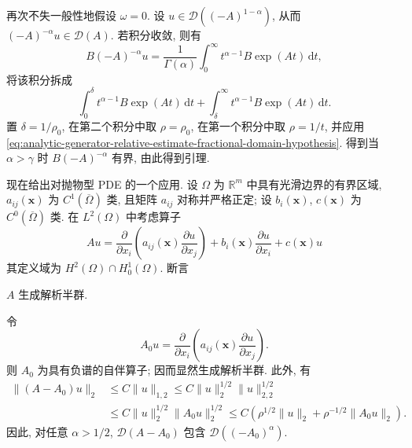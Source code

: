 \begin{Proof}
再次不失一般性地假设 $\omega=0$. 设 $u\in\mathcal{D}((-A)^{1-\alpha})$, 从而 $(-A)^{-\alpha}u\in\mathcal{D}(A)$. 若积分收敛, 则有
\begin{equation}\label{eq:analytic-generator-fractional-domain-converse-integral}
B(-A)^{-\alpha}u=\dfrac{1}{\Gamma(\alpha)}\int_0^\infty t^{\alpha-1}B\exp(At)\,\mathrm{d}t,
\end{equation}
将该积分拆成
\begin{equation}\label{eq:analytic-generator-fractional-domain-converse-integral-split}
\int_0^\delta t^{\alpha-1}B\exp(At)\,\mathrm{d}t+\int_\delta^\infty t^{\alpha-1}B\exp(At)\,\mathrm{d}t.
\end{equation}
置 $\delta=1/\rho_0$, 在第二个积分中取 $\rho=\rho_0$, 在第一个积分中取 $\rho=1/t$, 并应用 \eqref{eq:analytic-generator-relative-estimate-fractional-domain-hypothesis}. 得到当 $\alpha>\gamma$ 时 $B(-A)^{-\alpha}$ 有界, 由此得到引理.
\end{Proof}

现在给出对抛物型 PDE 的一个应用. 设 $\Omega$ 为 $\mathbb{R}^m$ 中具有光滑边界的有界区域, $a_{ij}(\bm{x})$ 为 $C^1(\overline\Omega)$ 类, 且矩阵 $a_{ij}$ 对称并严格正定; 设 $b_i(\bm{x})$, $c(\bm{x})$ 为 $C^0(\overline\Omega)$ 类. 在 $L^2(\Omega)$ 中考虑算子
\begin{equation}\label{eq:analytic-semigroup-elliptic-dirichlet-generator}
Au=\dfrac{\partial}{\partial x_i}\left(a_{ij}(\bm{x})\dfrac{\partial u}{\partial x_j}\right)+b_i(\bm{x})\dfrac{\partial u}{\partial x_i}+c(\bm{x})u
\end{equation}
其定义域为 $H^2(\Omega)\cap H_0^1(\Omega)$. 断言

\begin{Theorem}
\label{thm:elliptic-dirichlet-analytic-generation}
$A$ 生成解析半群.
\end{Theorem}

\begin{Proof}
令
\begin{equation}\label{eq:analytic-semigroup-elliptic-principal-self-adjoint-part}
A_0u=\dfrac{\partial}{\partial x_i}\left(a_{ij}(\bm{x})\dfrac{\partial u}{\partial x_j}\right).
\end{equation}
则 $A_0$ 为具有负谱的自伴算子; 因而显然生成解析半群. 此外, 有\[\begin{aligned}
\|(A-A_0)u\|_2&\leq C\|u\|_{1,2}\leq C\|u\|_2^{1/2}\|u\|_{2,2}^{1/2}\\
&\leq C\|u\|_2^{1/2}\|A_0u\|_2^{1/2}\leq C(\rho^{1/2}\|u\|_2+\rho^{-1/2}\|A_0u\|_2).
\end{aligned}\]因此, 对任意 $\alpha>1/2$, $\mathcal{D}(A-A_0)$ 包含 $\mathcal{D}((-A_0)^\alpha)$.
\end{Proof}

